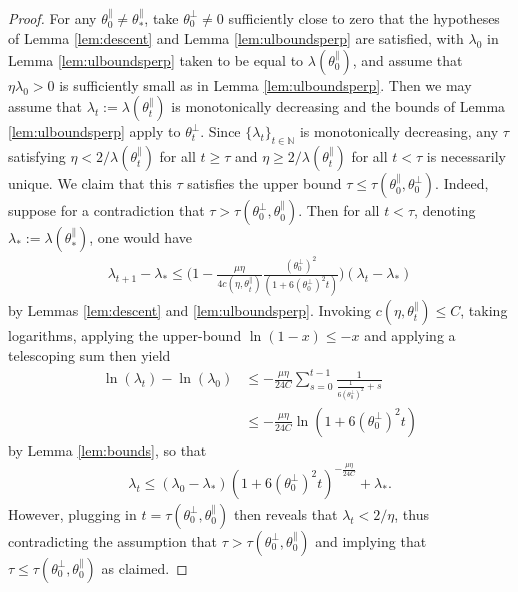 \documentclass{article}
\newcommand{\NB}{\mathbb{N}}
\newcommand{\tpa}{\theta^{\parallel}}
\newcommand{\tpe}{\theta^{\perp}}
\theoremstyle{plain}
\theoremstyle{definition}
\theoremstyle{remark}
\begin{document}
\begin{proof}
    For any $\tpa_0\neq\tpa_*$, take $\tpe_0\neq0$ sufficiently close to zero that the hypotheses of Lemma \ref{lem:descent} and Lemma \ref{lem:ulboundsperp} are satisfied, with $\lambda_0$ in Lemma \ref{lem:ulboundsperp} taken to be equal to $\lambda(\tpa_0)$, and assume that $\eta\lambda_0>0$ is sufficiently small as in Lemma \ref{lem:ulboundsperp}. Then we may assume that $\lambda_t:=\lambda(\tpa_t)$ is monotonically decreasing and the bounds of Lemma \ref{lem:ulboundsperp} apply to $\tpe_t$. Since $\{\lambda_t\}_{t\in\NB}$ is monotonically decreasing, any $\tau$ satisfying $\eta<2/\lambda(\tpa_t)$ for all $t\geq \tau$ and $\eta\geq 2/\lambda(\tpa_t)$ for all $t<\tau$ is necessarily unique. We claim that this $\tau$ satisfies the upper bound $\tau\leq \tau(\tpa_0,\tpe_0)$.  Indeed, suppose for a contradiction that $\tau>\tau(\tpe_0,\tpa_0)$. Then for all $t< \tau$, denoting $\lambda_*:=\lambda(\tpa_*)$, one would have
    \begin{align}
        \lambda_{t+1}-\lambda_*\leq\bigg(1-\frac{\mu\eta}{4c(\eta,\tpa_t)}{\frac{(\tpe_0)^2}{(1+6(\tpe_0)^2t)}}\bigg)(\lambda_t-\lambda_*)
    \end{align}
    by Lemmas \ref{lem:descent} and \ref{lem:ulboundsperp}. Invoking $c(\eta,\tpa_t)\leq C$, taking logarithms, applying the upper-bound $\ln(1-x)\leq -x$ and applying a telescoping sum then yield
    \begin{align}
        \ln(\lambda_t)-\ln(\lambda_0)&\leq -\frac{\mu\eta}{24C}\sum_{s=0}^{t-1}\frac{1}{\frac{1}{6(\tpe_0)^2}+s}\\&\leq -\frac{\mu\eta}{24C}\ln(1+6(\tpe_0)^2t)
    \end{align}
    by Lemma \ref{lem:bounds}, so that
    \begin{align}
        \lambda_t\leq (\lambda_0-\lambda_*)(1+6(\tpe_0)^2t)^{-\frac{\mu\eta}{24C}}+\lambda_*.
    \end{align}
    However, plugging in $t = \tau(\tpe_0,\tpa_0)$ then reveals that $\lambda_t< 2/\eta$, thus contradicting the assumption that $\tau>\tau(\tpe_0,\tpa_0)$ and implying that $\tau\leq \tau(\tpe_0,\tpa_0)$ as claimed.


\end{proof}
\end{document}
